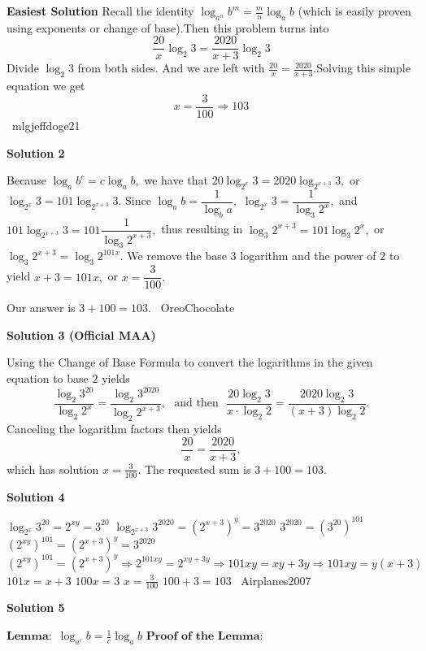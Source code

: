 \begin{enumerate}
 \textbf{Easiest Solution} Recall the identity $\log_{a^n} b^{m} = \frac{m}{n}\log_{a} b$ (which is easily proven using exponents or change of base).Then this problem turns into 
 \[\frac{20}{x}\log_{2} 3 = \frac{2020}{x+3}\log_{2} 3\]Divide $\log_{2} 3$ from both sides. And we are left with $\frac{20}{x}=\frac{2020}{x+3}$.Solving this simple equation we get 
 \[x = \frac{3}{100} \Rightarrow \boxed{103}\]~mlgjeffdoge21

 



\textbf{Solution 2}

Because $\log_a{b^c}=c\log_a{b},$ we have that $20\log_{2^x} 3 = 2020\log_{2^{x+3}} 3,$ or $\log_{2^x} 3 = 101\log_{2^{x+3}} 3.$ Since $\log_a{b}=\dfrac{1}{\log_b{a}},$ $\log_{2^x} 3=\dfrac{1}{\log_{3} 2^x},$ and $101\log_{2^{x+3}} 3=101\dfrac{1}{\log_{3}2^{x+3}},$ thus resulting in $\log_{3}2^{x+3}=101\log_{3} 2^x,$ or $\log_{3}2^{x+3}=\log_{3} 2^{101x}.$ We remove the base 3 logarithm and the power of 2 to yield $x+3=101x,$ or $x=\dfrac{3}{100}.$

 Our answer is $\boxed{3+100=103}.$~ OreoChocolate

 



\textbf{Solution 3 (Official MAA)}

Using the Change of Base Formula to convert the logarithms in the given equation to base $2$ yields
 \[\frac{\log_2 3^{20}}{\log_2 2^x} = \frac{\log_2 3^{2020}}{\log_2 2^{x+3}}, \text{~ and then ~} \frac{20\log_2 3}{x\cdot\log_2 2} = \frac{2020\log_2 3}{(x+3)\log_2 2}.\]Canceling the logarithm factors then yields
 \[\frac{20}x = \frac{2020}{x+3},\]which has solution $x = \frac3{100}.$ The requested sum is $3 + 100 = 103$.

 



\textbf{Solution 4}

$\log_{2^x} 3^{20} = 2^{xy} = 3^{20}$
$\log_{2^{x+3}} 3^{2020} = (2^{x+3})^y = 3^{2020}$
$3^{2020} = (3^{20})^{101}$
$(2^{xy})^{101} = (2^{x+3})^y = 3^{2020}$
$(2^{xy})^{101} = (2^{x+3})^y \Rightarrow 2^{101xy} = 2^{xy+3y} \Rightarrow 101xy = xy + 3y \Rightarrow 101xy = y(x+3)$
$101x = x + 3$
$100x = 3$
$x = \frac{3}{100}$
$100 + 3 = \boxed{103}$ ~Airplanes2007

 



\textbf{Solution 5}

$\textbf{Lemma}:$
$\log_{a^c}{b} = \frac{1}{c} \log_{a}{b}$
$\textbf{Proof of the Lemma}:$


\end{enumerate}

